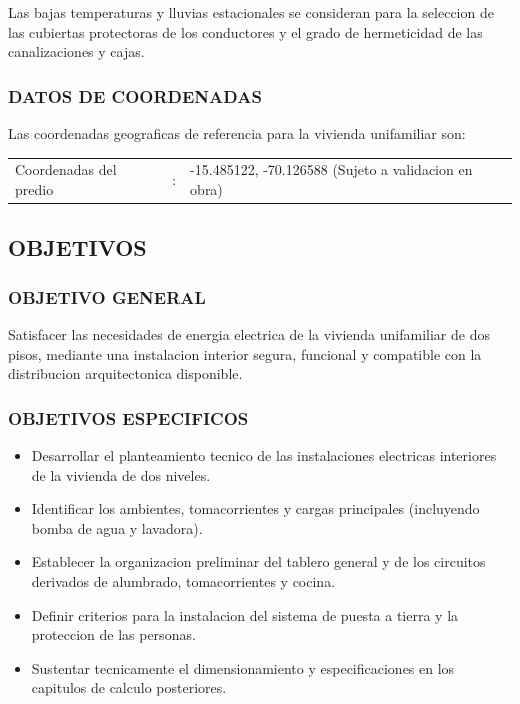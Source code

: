 Las bajas temperaturas y lluvias estacionales se consideran para la seleccion de las cubiertas protectoras de los conductores y el grado de hermeticidad de las canalizaciones y cajas.

\subsubsection{DATOS DE COORDENADAS}

Las coordenadas geograficas de referencia para la vivienda unifamiliar son:

\begin{center}
\begin{tabular}{p{2.20in}c p{2.65in}}
Coordenadas del predio & : & -15.485122, -70.126588 (Sujeto a validacion en obra) \\
\end{tabular}
\end{center}

\subsection{OBJETIVOS}

\subsubsection{OBJETIVO GENERAL}

Satisfacer las necesidades de energia electrica de la vivienda unifamiliar de dos pisos, mediante una instalacion interior segura, funcional y compatible con la distribucion arquitectonica disponible.

\subsubsection{OBJETIVOS ESPECIFICOS}

\begin{itemize}
  \item Desarrollar el planteamiento tecnico de las instalaciones electricas interiores de la vivienda de dos niveles.
  \item Identificar los ambientes, tomacorrientes y cargas principales (incluyendo bomba de agua y lavadora).
  \item Establecer la organizacion preliminar del tablero general y de los circuitos derivados de alumbrado, tomacorrientes y cocina.
  \item Definir criterios para la instalacion del sistema de puesta a tierra y la proteccion de las personas.
  \item Sustentar tecnicamente el dimensionamiento y especificaciones en los capitulos de calculo posteriores.
\end{itemize}

